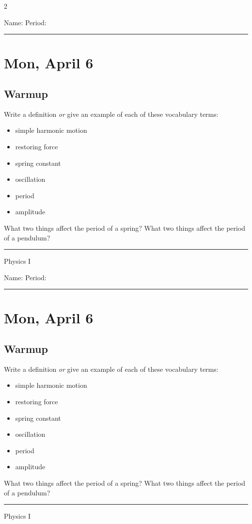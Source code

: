 \documentclass[10pt,landscape]{exam}
\def\todayDate{Mon, April 6}
\def\content{


\begin{questions}
  \question
    Write a definition \emph{or} give an example of each of these vocabulary terms:

    \begin{itemize}
      \item simple harmonic motion \vs 
      \item restoring force \vs 
      \item spring constant \vs 
      \item oscillation \vs 
      \item period \vs 
      \item amplitude \vs
    \end{itemize}

  \question
    What two things affect the period of a spring? \vs 
  \question
    What two things affect the period of a pendulum? \vs
\end{questions}


}
\begin{document}
\pagestyle{empty}

\setlength{\columnsep}{0.8in}
\begin{multicols*}{2}

\noindent  
Name: \hfill Period: \hspace{5em}
\vspace{0.5em}
\hrule

\section*{\todayDate}
\subsection*{Warmup}

\content

\vfill
\hrule
\vspace{0.5em}
\hfill {\sc Physics I}

\columnbreak

\noindent  
Name: \hfill Period: \hspace{5em}
\vspace{0.5em}
\hrule

\section*{\todayDate}
\subsection*{Warmup}

\content

\vfill
\hrule
\vspace{0.5em}
\hfill {\sc Physics I}

\end{multicols*}
\end{document}
